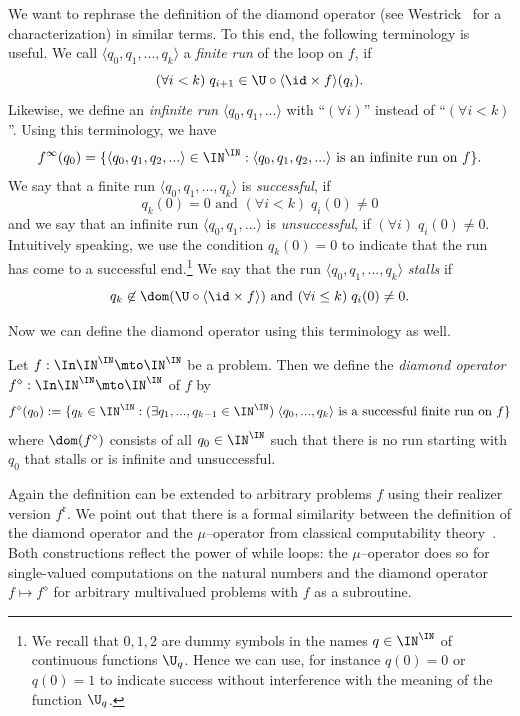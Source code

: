 \documentclass{lmcs}
\def\r{\mathrm{r}}
\begin{document}
We want to rephrase the definition of the diamond operator (see Westrick~\cite{Wes21} for a characterization) in similar terms.
To this end, the following terminology is useful. 
We call $\langle q_0,q_1,...,q_k\rangle$ a {\em finite run} of the loop on $f$,
if 
\[(\forall i<k)\;q_{i+1}\in \U\circ\langle \id\times f\rangle(q_i).\]
Likewise, we define an {\em infinite run} $\langle q_0,q_1,...\rangle$ with ``$(\forall i)$'' instead of ``$(\forall i<k)$''.
Using this terminology, we have
\[f^\infty(q_0)=\{\langle q_0,q_1,q_2,...\rangle\in\IN^\IN:\langle q_0,q_1,q_2,...\rangle\mbox{ is an infinite run on $f$}\}.\]
We say that a finite run $\langle q_0,q_1,...,q_k\rangle$ is {\em successful}, if
\[q_k(0)=0\mbox{ and }(\forall i<k)\;q_i(0)\not=0\]
and we say that an infinite run $\langle q_0,q_1,...\rangle$ is {\em unsuccessful}, if $(\forall i)\;q_i(0)\not=0$.
Intuitively speaking, we use the condition $q_k(0)=0$ to indicate that the run has come to a successful end.\footnote{We 
recall that $0,1,2$ are dummy symbols in the names $q\in\IN^\IN$ of continuous functions $\U_q$. Hence we can use, for instance $q(0)=0$ or $q(0)=1$ to indicate success without interference with the
meaning of the function $\U_q$.}
We say that the run $\langle q_0,q_1,...,q_k\rangle$ {\em stalls} if 
\[q_k\not\in\dom(\U\circ\langle\id\times f\rangle)\mbox{ and }(\forall i\leq k)\;q_i(0)\not=0.\]

\noindent
Now we can define the diamond operator using this terminology as well. 

\begin{defi}
Let $f:\In\IN^\IN\mto\IN^\IN$ be a problem. Then we define
the {\em diamond operator} $f^\diamond:\In\IN^\IN\mto\IN^\IN$ of $f$
by
\[f^\diamond(q_0):=\{q_k\in\IN^\IN:(\exists q_1,...,q_{k-1}\in\IN^\IN)\;\langle q_0,...,q_k\rangle\mbox{ is a successful finite run on $f$}\}\]
where $\dom(f^\diamond)$ consists of all $q_0\in\IN^\IN$ such that there is no run starting with $q_0$ that stalls or is infinite and unsuccessful.
\end{defi}

\noindent
Again the definition can be extended to arbitrary problems $f$ using their realizer version $f^\r$.
We point out that there is a formal similarity between the definition of the diamond operator and the $\mu$--operator
from classical computability theory~\cite{Odi89}. Both constructions reflect the power of while loops:
the $\mu$--operator does so for single-valued computations on the natural numbers and the 
diamond operator ${f\mapsto f^\diamond}$
for arbitrary multivalued problems with $f$ as a subroutine.
\end{document}

